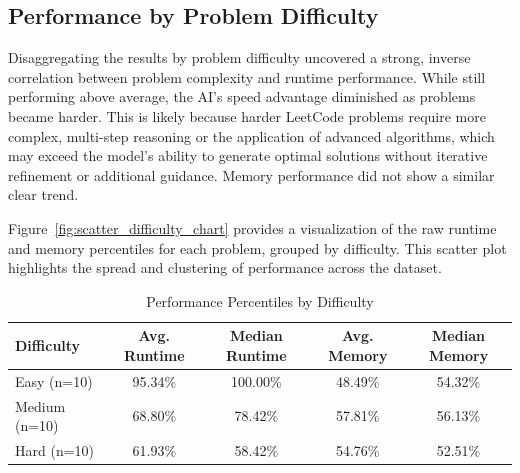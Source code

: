 \documentclass[12pt, a4paper]{article}
\begin{document}
\subsection{Performance by Problem Difficulty}
Disaggregating the results by problem difficulty uncovered a strong, inverse correlation between problem complexity and runtime performance. While still performing above average, the AI's speed advantage diminished as problems became harder. This is likely because harder LeetCode problems require more complex, multi-step reasoning or the application of advanced algorithms, which may exceed the model's ability to generate optimal solutions without iterative refinement or additional guidance. Memory performance did not show a similar clear trend.

Figure~\ref{fig:scatter_difficulty_chart} provides a visualization of the raw runtime and memory percentiles for each problem, grouped by difficulty. This scatter plot highlights the spread and clustering of performance across the dataset.

\begin{table}[h!]
\centering
\caption{Performance Percentiles by Difficulty}
\label{tab:difficulty_performance}
\begin{tabular}{@{}lcccc@{}}
\toprule
\textbf{Difficulty} & \textbf{Avg. Runtime} & \textbf{Median Runtime} & \textbf{Avg. Memory} & \textbf{Median Memory} \\ \midrule
Easy (n=10)   & 95.34\% & 100.00\% & 48.49\% & 54.32\% \\
Medium (n=10) & 68.80\% & 78.42\% & 57.81\% & 56.13\% \\
Hard (n=10)   & 61.93\% & 58.42\% & 54.76\% & 52.51\% \\ \bottomrule
\end{tabular}
\end{table}
\end{document}
